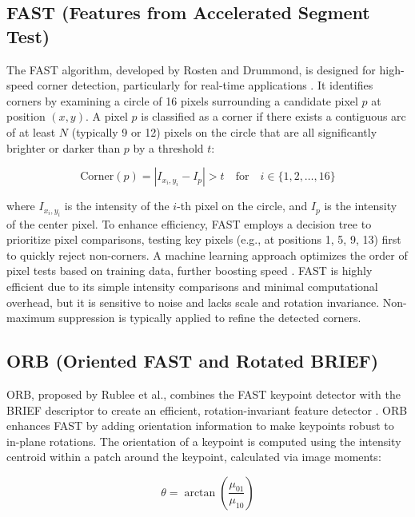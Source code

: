 \documentclass[journal]{IEEEtran}
\begin{document}
\subsection{FAST (Features from Accelerated Segment Test)}
The FAST algorithm, developed by Rosten and Drummond, is designed for high-speed corner detection, particularly for real-time applications \cite{FAST}. It identifies corners by examining a circle of 16 pixels surrounding a candidate pixel \( p \) at position \( (x, y) \). A pixel \( p \) is classified as a corner if there exists a contiguous arc of at least \( N \) (typically 9 or 12) pixels on the circle that are all significantly brighter or darker than \( p \) by a threshold \( t \):

\begin{equation}
\text{Corner}(p) = \left| I_{x_i, y_i} - I_p \right| > t \quad \text{for} \quad i \in \{1, 2, \ldots, 16\}
\end{equation}

where \( I_{x_i, y_i} \) is the intensity of the \( i \)-th pixel on the circle, and \( I_p \) is the intensity of the center pixel. To enhance efficiency, FAST employs a decision tree to prioritize pixel comparisons, testing key pixels (e.g., at positions 1, 5, 9, 13) first to quickly reject non-corners. A machine learning approach optimizes the order of pixel tests based on training data, further boosting speed \cite{FAST}. FAST is highly efficient due to its simple intensity comparisons and minimal computational overhead, but it is sensitive to noise and lacks scale and rotation invariance. Non-maximum suppression is typically applied to refine the detected corners.

\subsection{ORB (Oriented FAST and Rotated BRIEF)}
ORB, proposed by Rublee et al., combines the FAST keypoint detector with the BRIEF descriptor to create an efficient, rotation-invariant feature detector \cite{ORB}. ORB enhances FAST by adding orientation information to make keypoints robust to in-plane rotations. The orientation of a keypoint is computed using the intensity centroid within a patch around the keypoint, calculated via image moments:

\begin{equation}
\theta = \arctan\left(\frac{\mu_{01}}{\mu_{10}}\right)
\end{equation}
\end{document}
